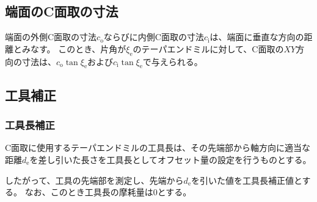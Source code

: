 \clearpage


\subsection{端面のC面取の寸法}
端面の外側C面取の寸法$c_\mathrm o$ならびに内側C面取の寸法$c_\mathrm i$は、端面に垂直な方向の距離とみなす。
このとき、片角が$\xi_\mathrm e$のテーパエンドミルに対して、C面取の$XY$方向の寸法は、$c_\mathrm o\tan\xi_\mathrm e$および$c_\mathrm i\tan\xi_\mathrm e$で与えられる。


\subsection{工具補正}

\subsubsection{工具長補正}
C面取に使用するテーパエンドミルの工具長は、その先端部から軸方向に適当な距離$d_\mathrm e$を差し引いた長さを工具長としてオフセット量の設定を行うものとする。

したがって、工具の先端部を測定し、先端から$d_\mathrm e$を引いた値を工具長補正値とする。
なお、このとき工具長の摩耗量は0とする。

